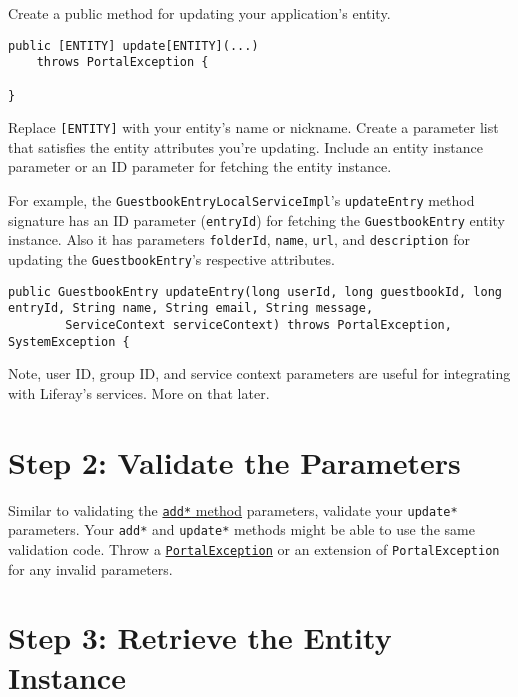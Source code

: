 Create a public method for updating your application's entity.

\begin{verbatim}
public [ENTITY] update[ENTITY](...)
    throws PortalException {
    
} 
\end{verbatim}

Replace \texttt{{[}ENTITY{]}} with your entity's name or nickname.
Create a parameter list that satisfies the entity attributes you're
updating. Include an entity instance parameter or an ID parameter for
fetching the entity instance.

For example, the \texttt{GuestbookEntryLocalServiceImpl}'s
\texttt{updateEntry} method signature has an ID parameter
(\texttt{entryId}) for fetching the \texttt{GuestbookEntry} entity
instance. Also it has parameters \texttt{folderId}, \texttt{name},
\texttt{url}, and \texttt{description} for updating the
\texttt{GuestbookEntry}'s respective attributes.

\begin{verbatim}
public GuestbookEntry updateEntry(long userId, long guestbookId, long entryId, String name, String email, String message,
        ServiceContext serviceContext) throws PortalException, SystemException {
\end{verbatim}

Note, user ID, group ID, and service context parameters are useful for
integrating with Liferay's services. More on that later.

\section{Step 2: Validate the
Parameters}\label{step-2-validate-the-parameters-1}

Similar to validating the
\href{/docs/7-2/appdev/-/knowledge_base/a/implementing-an-add-method}{\texttt{add*}
method} parameters, validate your \texttt{update*} parameters. Your
\texttt{add*} and \texttt{update*} methods might be able to use the same
validation code. Throw a
\href{https://docs.liferay.com/dxp/portal/7.2-latest/javadocs/portal-kernel/com/liferay/portal/kernel/exception/PortalException.html}{\texttt{PortalException}}
or an extension of \texttt{PortalException} for any invalid parameters.

\section{Step 3: Retrieve the Entity
Instance}\label{step-3-retrieve-the-entity-instance}

